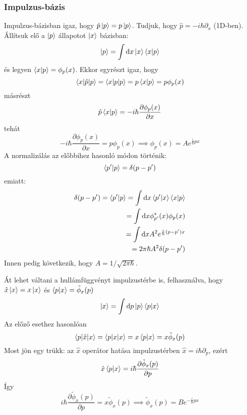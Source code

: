 \documentclass[12pt]{article}
\theoremstyle{plain}
\newcommand{\dd}{\mathrm{d}}
\begin{document}
\subsubsection{Impulzus-bázis}
Impulzus-bázisban igaz, hogy $\hat p \ket p = p\ket p$. Tudjuk, hogy $\hat p = -i\hbar\partial_x$ (1D-ben).
Állítsuk elő a $\ket p$ állapotot $\ket x$ bázisban:
\begin{equation}
    \ket p = \int\dd x \ket x \braket{x|p}
\end{equation}
és legyen $\braket{x|p}=\phi_p(x)$. Ekkor egyrészt igaz, hogy
\begin{equation}
    \braket{x|\hat p|p} = \braket{x|p|p} = p\braket{x|p} = p\phi_p(x)
\end{equation}
másrészt
\begin{equation}
    \hat p \braket{x|p} = -i\hbar\frac{\partial \phi_p(x)}{\partial x} 
\end{equation}
tehát
\begin{equation}
    -i\hbar\frac{\partial \phi_p(x)}{\partial x} =  p\phi_p(x) \implies \phi_p(x) = A e^{\frac{i}{\hbar} px}
\end{equation}
A normalizálás az előbbihez hasonló módon történik:
\begin{equation}
    \braket{p'|p} = \delta(p-p')
\end{equation}
emiatt:
\begin{eqnarray}
    \delta(p-p') = \braket{p'|p} = \int\dd x \braket{p'|x}\braket{x|p} \\
    = \int\dd x \phi_{p'}^{*}(x)\phi_p(x) \\
    = \int\dd x A^2 e^{\frac{i}{\hbar} (p-p') x} \\
    = 2\pi\hbar A^2 \delta (p-p')
\end{eqnarray}
Innen pedig következik, hogy $A=1/\sqrt{2\pi\hbar}$.

Át lehet váltani a hullámfüggvényt impulzustérbe is, felhasználva, hogy $\hat x\ket x = x\ket x$ és $\braket{p|x}=\tilde\phi_x(p)$
\begin{equation}
    \ket x = \int\dd p \ket p \braket{p|x}
\end{equation}
Az előző esethez hasonlóan
\begin{equation}
    \braket{p|\hat x|x} = \braket{p|x|x} = x \braket{p|x} = x\tilde\phi_x(p)
\end{equation}
Most jön egy trükk: az $\hat x$ operátor hatása impulzustérben $\hat x = i\hbar\partial_p$, ezért
\begin{equation}
    \hat x \braket{p|x} = i\hbar \frac{\partial\tilde\phi_x(p)}{\partial p}
\end{equation}
Így 
\begin{equation}
    i\hbar \frac{\partial\tilde\phi_x(p)}{\partial p} = x\tilde\phi_x(p) \implies \tilde\phi_x(p) = B e^{-\frac{i}{\hbar}px}
\end{equation}
\end{document}
